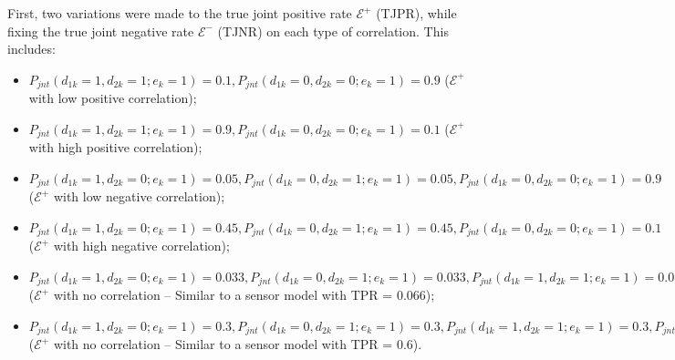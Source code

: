 First, two variations were made to the true joint positive rate $\mathcal{E^+}$ (TJPR), while fixing the true joint negative rate $\mathcal{E^-}$ (TJNR) on each type of correlation. This includes:
\begin{itemize}
    \item $P_{jnt}(d_{1k}=1, d_{2k}=1 ; e_k=1) = 0.1, P_{jnt}(d_{1k}=0, d_{2k}=0 ; e_k=1) = 0.9$ ($\mathcal{E^+}$ with low positive correlation);
    \item $P_{jnt}(d_{1k}=1, d_{2k}=1 ; e_k=1) = 0.9, P_{jnt}(d_{1k}=0, d_{2k}=0 ; e_k=1) = 0.1$ ($\mathcal{E^+}$ with high positive correlation);
    \item $P_{jnt}(d_{1k}=1, d_{2k}=0 ; e_k=1) = 0.05, P_{jnt}(d_{1k}=0, d_{2k}=1 ; e_k=1) = 0.05, P_{jnt}(d_{1k}=0, d_{2k}=0 ; e_k=1) = 0.9$ ($\mathcal{E^+}$ with low negative correlation);
    \item $P_{jnt}(d_{1k}=1, d_{2k}=0 ; e_k=1) = 0.45, P_{jnt}(d_{1k}=0, d_{2k}=1 ; e_k=1) = 0.45, P_{jnt}(d_{1k}=0, d_{2k}=0 ; e_k=1) = 0.1$ ($\mathcal{E^+}$ with high negative correlation);
    \item $P_{jnt}(d_{1k}=1, d_{2k}=0 ; e_k=1) = 0.033, P_{jnt}(d_{1k}=0, d_{2k}=1 ; e_k=1) = 0.033, P_{jnt}(d_{1k}=1, d_{2k}=1 ; e_k=1) = 0.033, P_{jnt}(d_{1k}=0, d_{2k}=0 ; e_k=1) = 0.901$ ($\mathcal{E^+}$ with no correlation -- Similar to a sensor model with TPR = 0.066);
    \item $P_{jnt}(d_{1k}=1, d_{2k}=0 ; e_k=1) = 0.3, P_{jnt}(d_{1k}=0, d_{2k}=1 ; e_k=1) = 0.3, P_{jnt}(d_{1k}=1, d_{2k}=1 ; e_k=1) = 0.3, P_{jnt}(d_{1k}=0, d_{2k}=0 ; e_k=1) = 0.1$ ($\mathcal{E^+}$ with no correlation -- Similar to a sensor model with TPR = 0.6).
\end{itemize}


